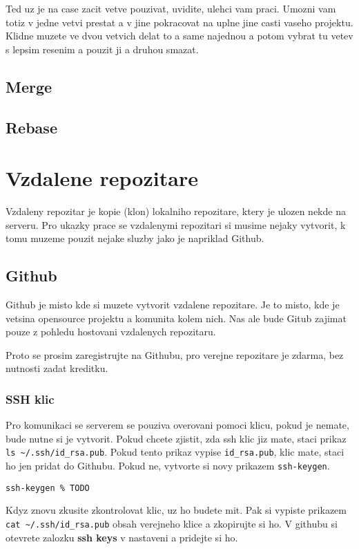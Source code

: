 \documentclass[12pt,a5paper]{article}
\begin{document}
Ted uz je na case zacit vetve pouzivat, uvidite, ulehci vam praci. Umozni vam totiz v jedne vetvi prestat a v jine pokracovat na uplne jine casti vaseho projektu. Klidne muzete ve dvou vetvich delat to a same najednou a potom vybrat tu vetev s lepsim resenim a pouzit ji a druhou smazat.


\subsection{Merge}
\subsection{Rebase}
\section{Vzdalene repozitare}

Vzdaleny repozitar je kopie (klon) lokalniho repozitare, ktery je ulozen nekde na serveru. Pro ukazky prace se vzdalenymi repozitari si musime nejaky vytvorit, k tomu muzeme pouzit nejake sluzby jako je napriklad Github.

\subsection{Github}

Github je misto kde si muzete vytvorit vzdalene repozitare. Je to misto, kde je vetsina opensource projektu a komunita kolem nich. Nas ale bude Gitub zajimat pouze z pohledu hostovani vzdalenych repozitaru.

Proto se prosim zaregistrujte na Githubu, pro verejne repozitare je zdarma, bez nutnosti zadat kreditku.

\subsubsection{SSH klic}

Pro komunikaci se serverem se pouziva overovani pomoci klicu, pokud je nemate, bude nutne si je vytvorit. Pokud chcete zjistit, zda ssh klic jiz mate, staci prikaz \lstinline|ls ~/.ssh/id_rsa.pub|. Pokud tento prikaz vypise \lstinline|id_rsa.pub|, klic mate, staci ho jen pridat do Githubu. Pokud ne, vytvorte si novy prikazem \lstinline|ssh-keygen|.

\begin{lstlisting}
ssh-keygen % TODO
\end{lstlisting}

Kdyz znovu zkusite zkontrolovat klic, uz ho budete mit. Pak si vypiste prikazem \lstinline|cat ~/.ssh/id_rsa.pub| obsah verejneho klice a zkopirujte si ho. V githubu si otevrete zalozku {\bf ssh keys} v nastaveni a pridejte si ho.
\end{document}
